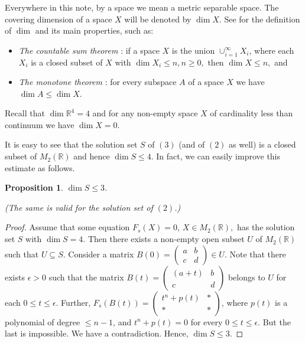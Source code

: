 \documentclass[12pt]{amsart}
\theoremstyle{plain}
\newtheorem{prop}[thm]{Proposition}
\theoremstyle{definition}
\begin{document}
Everywhere in this note, by a space we mean a metric separable space. The covering dimension of a space $X$ will be denoted by $\dim X.$ See \cite[p. 385]{E} for the definition of $\dim$ and its main properties, such as:

\begin{itemize}
\item[(i)] {\it The countable sum theorem} \cite[Theorem 7.2.1]{E}: if a space $X$ is the union  $\cup_{i=1}^\infty X_i$, where each $X_i$ is a closed subset of $X$  with $\dim X_i \leq n, n \geq 0,$  then $\dim X \leq n,$ and 

\item[(ii)]{\it The monotone theorem} \cite[Theorem 7.3.4]{E}: for every subspace $A$ of a  space $X$ we have $\dim A \leq \dim X$.
\end{itemize}

Recall  that  $\dim \mathbb R^4 = 4$ and for any non-empty  space $X$ of cardinality less than continuum we have $\dim X = 0$. 

It is easy to see that the solution set $S$ of $(3)$ (and of $(2)$ as well) is a closed subset of $M_2(\mathbb R)$ and hence $\dim S \leq 4$. In fact, we can easily improve this estimate as follows.


\begin{prop} $\dim S \leq 3$. 

(The same is valid for the solution set of $(2)$.)
\end{prop} 

\begin{proof} Assume that some  equation
$F_s(X) = 0$, $X\in M_2(\mathbb R),$ has the solution set $S$ with  $\dim S = 4$.
Then there exists a non-empty open subset $U$ of $M_2(\mathbb R)$ such that $U \subseteq S$.
Consider a matrix $B(0) = \left(\begin{array}{rr}  a & b \\ c & d  \end{array}\right)  \in U$. Note that there exists $\epsilon >0$ such that  the matrix $B(t) = \left(\begin{array}{rr}  (a+t) & b \\ c & d  \end{array}\right)$ belongs to $U$ for each $0 \leq t \leq \epsilon$.
Further,  $F_s(B(t)) = \left(\begin{array}{rr}  t^n + p(t) & * \\ * & * \end{array}\right)$, where $p(t)$ is a polynomial  of degree $\leq n-1$, and $t^n +p(t) = 0$ for every
$0 \leq t \leq \epsilon$. But the last is impossible. We have a contradiction. Hence, $\dim S \leq 3$. 
 \end{proof}
 
\end{document}
